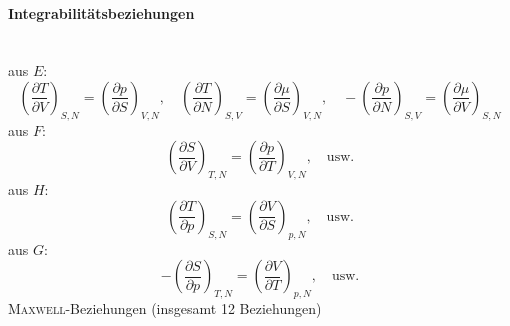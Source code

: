 \paragraph{Integrabilitätsbeziehungen} \mbox{}\\
aus $E$:
\begin{equation}
    \left( \frac{\partial T}{\partial V} \right)_{S, N} = \left( \frac{\partial p}{\partial S} \right)_{V, N}, \quad
    \left( \frac{\partial T}{\partial N} \right)_{S, V} = \left( \frac{\partial \mu}{\partial S} \right)_{V, N}, \quad
    - \left( \frac{\partial p}{\partial N} \right)_{S, V} = \left( \frac{\partial \mu}{\partial V} \right)_{S, N}
\end{equation}
aus $F$:
\begin{equation}
    \left( \frac{\partial S}{\partial V} \right)_{T, N} = \left( \frac{\partial p}{\partial T} \right)_{V, N}, \quad \text{usw.}
\end{equation}
aus $H$:
\begin{equation}
    \left( \frac{\partial T}{\partial p} \right)_{S, N} = \left( \frac{\partial V}{\partial S} \right)_{p, N}, \quad \text{usw.}
\end{equation}
aus $G$:
\begin{equation}
    - \left( \frac{\partial S}{\partial p} \right)_{T, N} = \left( \frac{\partial V}{\partial T} \right)_{p, N}, \quad \text{usw.}
\end{equation}
\textsc{Maxwell}-Beziehungen (insgesamt 12 Beziehungen)
